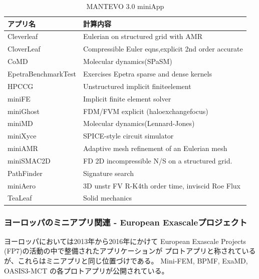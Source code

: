 \begin{table}[H]
\caption{MANTEVO 3.0 miniApp}
\label{tab:MANTEVO-miniapp}
{
\begin{tabular}{p{50mm}|p{100mm}} \hline
アプリ名		&	計算内容 \\ \hline

Cleverleaf 	&	Eulerian on structured grid with AMR  \\ \hline
CloverLeaf 	&	Compressible Euler eqns,explicit 2nd order accurate \\ \hline
CoMD 		&	Molecular dynamics(SPaSM)  \\ \hline
EpetraBenchmarkTest	&	Exercises Epetra sparse and dense kernels \\ \hline
HPCCG 		&	Unstructured implicit finiteelement  \\ \hline
miniFE 		&	Implicit finite element solver \\ \hline
miniGhost 	&	FDM/FVM explicit (haloexchangefocus) \\ \hline
miniMD 		&	Molecular dynamics(Lennard-Jones)  \\ \hline
miniXyce 	&	SPICE-style circuit simulator \\ \hline
miniAMR 		&	Adaptive mesh refinement of an Eulerian mesh \\ \hline
miniSMAC2D 	&	FD 2D incompressible N/S on a structured grid. \\ \hline
PathFinder 	&	Signature search \\ \hline
miniAero 	&	3D unstr FV R-K4th order time, inviscid Roe Flux \\ \hline
TeaLeaf 	&	Solid mechanics \\ \hline
\end{tabular}
}
\end{table}


\subsubsection{ヨーロッパのミニアプリ関連 - European Exascaleプロジェクト}
ヨーロッパにおいては2013年から2016年にかけて
European Exascale Projects (FP7)の活動の中で整備されたアプリケーションが
プロトアプリと称されているが、これらはミニアプリと同じ位置づけである。
Mini-FEM, BPMF, ExaMD, OASIS3-MCT の各プロトアプリが公開されている\cite{EXA2CT}。

